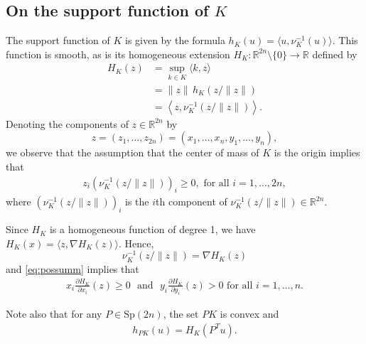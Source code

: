 \documentclass[12pt]{amsart}
\theoremstyle{definition}
\newcommand{\RR}{{\mathbb R}}
\begin{document}
\subsection{On the support function of $K$} The support function of $K$ is given by the formula $h_K(u) = \langle u,\nu^{-1}_{K}(u)\rangle$.  This function is smooth, as is its homogeneous extension $H_K \colon \RR^{2n} \setminus \{0\} \to \RR$ defined by 
\begin{align*}
    H_K(z)  &=\sup_{k \in K} \langle k,z\rangle \\
    {\,} &=\|z\| \, h_K \left( z/ \|z\|\right)\\
    {\,}     &=\left\langle z,\nu^{-1}_{K}\left(  z / \|z\|\right)\right\rangle.
\end{align*}
Denoting the components of $z \in \RR^{2n}$ by $$z=(z_1, \dots, z_{2n}) = (x_1, \dots, x_n, y_1, \dots, y_n),$$
we observe that the assumption that the center of mass of $K$ is the origin implies that
\begin{align}\label{eq:possumm}
    z_i (\nu^{-1}_{K}\left(  z / \|z\|\right))_i \geq 0, \text{ for all $i =1, \dots , 2n$},
\end{align}
where $(\nu^{-1}_{K}\left(  z / \|z\|\right))_i$ is the $i$th component of $\nu^{-1}_{K}\left(  z / \|z\|\right) \in \RR^{2n}$.


Since $H_K$ is a homogeneous function of degree 1, we have  $H_K(x) = \langle z,\nabla H_K(z)\rangle$. Hence, $$\nu^{-1}_{K}\left(  z / \|z\|\right) = \nabla H_K(z) $$
and \eqref{eq:possumm} implies that  
\begin{align}\label{eq:gradprts}
    x_i\frac{\partial H_K}{\partial x_i}(z)  \geq 0 \,\,\text{  and   }\,\,  y_i\frac{\partial H_K}{\partial y_i}(z)>0 \text{ for all $i =1, \dots , n$}.
\end{align}

Note also that for any $P \in \mathrm{Sp}(2n)$, the set $PK$ is convex and 
\begin{align}\label{eq;trans}
    h_{PK}(u) = H_K(P^T u).
\end{align}
\end{document}
